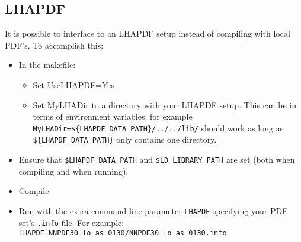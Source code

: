 \documentclass[aps,superscriptaddress,nofootinbib]{revtex4}
\begin{document}
\subsection{LHAPDF}
\label{sec:LHAPDF}
It is possible to interface to an LHAPDF setup instead of compiling with local PDF's.  To accomplish this:
\begin{itemize}
\item In the makefile:
\begin{itemize}
\item Set UseLHAPDF=Yes
\item Set MyLHADir to a directory with your LHAPDF setup.  This can be in terms of environment variables; for example \verb|MyLHADir=${LHAPDF_DATA_PATH}/../../lib/| should work as long as \verb|${LHAPDF_DATA_PATH}| only contains one directory.
\end{itemize}
\item Ensure that \verb|$LHAPDF_DATA_PATH| and \verb|$LD_LIBRARY_PATH| are set (both when compiling and when running).
\item Compile
\item Run with the extra command line parameter \verb|LHAPDF| specifying your PDF set's \verb|.info| file.  For example: \verb|LHAPDF=NNPDF30_lo_as_0130/NNPDF30_lo_as_0130.info|
\end{itemize}
\end{document}
